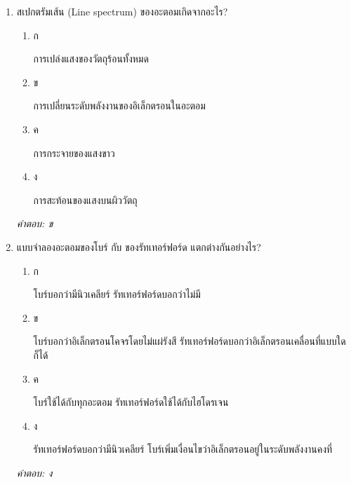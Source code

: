 \documentclass[12pt]{article}
\begin{document}
\begin{enumerate}[label=\arabic*., itemsep=0.5\baselineskip, topsep=0.5\baselineskip, leftmargin=*]
\item สเปกตรัมเส้น (Line spectrum) ของอะตอมเกิดจากอะไร?
\begin{enumerate}[label=\alph*)., itemsep=0.3\baselineskip, topsep=0.3\baselineskip]
\item ก\ 
\begin{minipage}[t]{0.9\linewidth}
\raggedright การเปล่งแสงของวัตถุร้อนทั้งหมด
\end{minipage}
\item ข\ 
\begin{minipage}[t]{0.9\linewidth}
\raggedright การเปลี่ยนระดับพลังงานของอิเล็กตรอนในอะตอม
\end{minipage}
\item ค\ 
\begin{minipage}[t]{0.9\linewidth}
\raggedright การกระจายของแสงขาว
\end{minipage}
\item ง\ 
\begin{minipage}[t]{0.9\linewidth}
\raggedright การสะท้อนของแสงบนผิววัตถุ
\end{minipage}
\end{enumerate}
\vspace{-0.3\baselineskip}
\begin{small}
\textit{คำตอบ: ข}
\end{small}

\item แบบจำลองอะตอมของโบร์ กับ ของรัทเทอร์ฟอร์ด แตกต่างกันอย่างไร?
\begin{enumerate}[label=\alph*)., itemsep=0.3\baselineskip, topsep=0.3\baselineskip]
\item ก\ 
\begin{minipage}[t]{0.9\linewidth}
\raggedright โบร์บอกว่ามีนิวเคลียร์ รัทเทอร์ฟอร์ดบอกว่าไม่มี
\end{minipage}
\item ข\ 
\begin{minipage}[t]{0.9\linewidth}
\raggedright โบร์บอกว่าอิเล็กตรอนโคจรโดยไม่แผ่รังสี รัทเทอร์ฟอร์ดบอกว่าอิเล็กตรอนเคลื่อนที่แบบใดก็ได้
\end{minipage}
\item ค\ 
\begin{minipage}[t]{0.9\linewidth}
\raggedright โบร์ใช้ได้กับทุกอะตอม รัทเทอร์ฟอร์ดใช้ได้กับไฮโดรเจน
\end{minipage}
\item ง\ 
\begin{minipage}[t]{0.9\linewidth}
\raggedright รัทเทอร์ฟอร์ดบอกว่ามีนิวเคลียร์ โบร์เพิ่มเงื่อนไขว่าอิเล็กตรอนอยู่ในระดับพลังงานคงที่
\end{minipage}
\end{enumerate}
\vspace{-0.3\baselineskip}
\begin{small}
\textit{คำตอบ: ง}
\end{small}


\end{enumerate}
\end{document}
